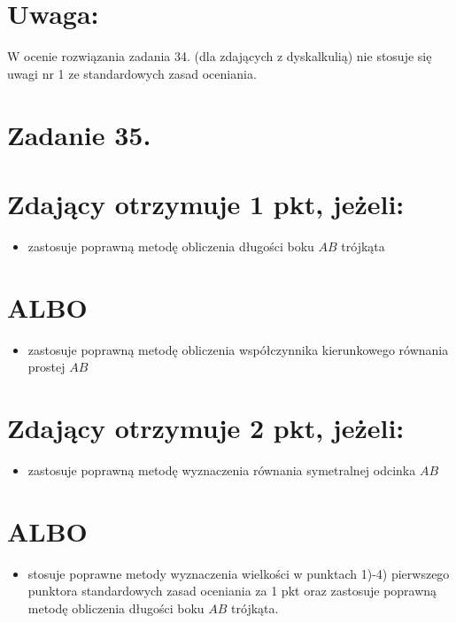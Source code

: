 \documentclass[10pt]{article}
\begin{document}
\section*{Uwaga:}
W ocenie rozwiązania zadania 34. (dla zdających z dyskalkulią) nie stosuje się uwagi nr 1 ze standardowych zasad oceniania.

\section*{Zadanie 35.}
\section*{Zdający otrzymuje 1 pkt, jeżeli:}
\begin{itemize}
  \item zastosuje poprawną metodę obliczenia długości boku $A B$ trójkąta
\end{itemize}

\section*{ALBO}
\begin{itemize}
  \item zastosuje poprawną metodę obliczenia współczynnika kierunkowego równania prostej $A B$
\end{itemize}

\section*{Zdający otrzymuje 2 pkt, jeżeli:}
\begin{itemize}
  \item zastosuje poprawną metodę wyznaczenia równania symetralnej odcinka $A B$
\end{itemize}

\section*{ALBO}
\begin{itemize}
  \item stosuje poprawne metody wyznaczenia wielkości w punktach 1)-4) pierwszego punktora standardowych zasad oceniania za 1 pkt oraz zastosuje poprawną metodę obliczenia długości boku $A B$ trójkąta.
\end{itemize}
\end{document}
